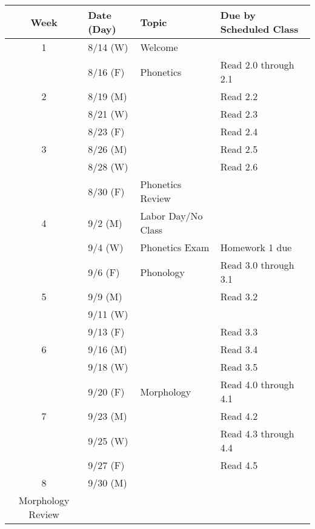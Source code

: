 \documentclass{article}
\makeatletter
\newcommand{\cellbreak}[2]{
    \begin{tabular}[t]{@{}l@{}}
      #1\\
      #2
    \end{tabular}}
\newcommand{\rowvspace}{\rule{0pt}{14pt}}
\makeatother
\begin{document}
    \begin{longtable}{c l l l}
      Week  & Date (Day)  & Topic                           & Due by Scheduled Class\\
      \hline
      1     & 8/14 (W)    & Welcome \rowvspace              & \\
            & 8/16 (F)    & Phonetics                       & Read 2.0 through 2.1\\
      2     & 8/19 (M)    &                                 & Read 2.2\\
            & 8/21 (W)    &                                 & Read 2.3\\
            & 8/23 (F)    &                                 & Read 2.4\\
      3     & 8/26 (M)    &                                 & Read 2.5\\
            & 8/28 (W)    &                                 & Read 2.6\\
            & 8/30 (F)    & Phonetics Review                & \\
      4     & 9/2 (M)     & Labor Day/No Class              & \\
            & 9/4 (W)     & Phonetics Exam                  & Homework 1 due\\
            & 9/6 (F)     & Phonology                       & Read 3.0 through 3.1\\
      5     & 9/9 (M)     &                                 & Read 3.2\\
            & 9/11 (W)    &                                 & \\
            & 9/13 (F)    &                                 & Read 3.3\\
      6     & 9/16 (M)    &                                 & Read 3.4\\
            & 9/18 (W)    &                                 & Read 3.5\\
            & 9/20 (F)    & Morphology                      & Read 4.0 through 4.1\\
      7     & 9/23 (M)    &                                 & Read 4.2\\
            & 9/25 (W)    &                                 & Read 4.3 through 4.4\\
            & 9/27 (F)    &                                 & Read 4.5\\
      8     & 9/30 (M)    & \cellbreak{Phonology \&}
                                      {Morphology Review}   & \\

\end{longtable}
\end{document}
